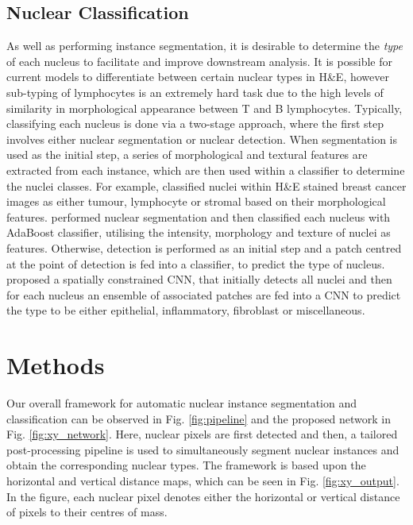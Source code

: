 \documentclass[journal]{IEEEtran}
\begin{document}
	\subsection{Nuclear Classification}
	As well as performing instance segmentation, it is desirable to determine the \textit{type} of each nucleus to facilitate and improve downstream analysis. It is possible for current models to differentiate between certain nuclear types in H\&E, however sub-typing of lymphocytes is an extremely hard task due to the high levels of similarity in morphological appearance between T and B lymphocytes. Typically, classifying each nucleus is done via a two-stage approach, where the first step involves either nuclear segmentation or nuclear detection. When segmentation is used as the initial step, a series of morphological and textural features are extracted from each instance, which are then used within a classifier to determine the nuclei classes. For example, \cite{nguyen2011prostate} classified nuclei within H\&E stained breast cancer images as either tumour, lymphocyte or stromal based on their morphological features. \cite{yuan2012quantitative} performed nuclear segmentation and then classified each nucleus with AdaBoost classifier, utilising the intensity, morphology and texture of nuclei as features. Otherwise, detection is performed as an initial step and a patch centred at the point of detection is fed into a classifier, to predict the type of nucleus. \cite{sirinukunwattana2016locality} proposed a spatially constrained CNN, that initially detects all nuclei and then for each nucleus an ensemble of associated patches are fed into a CNN to predict the type to be either epithelial, inflammatory, fibroblast or miscellaneous.
	
	


	\section{Methods} \label{section:methods}
	Our overall framework for automatic nuclear instance segmentation and classification can be observed in Fig. \ref{fig:pipeline} and the proposed network in Fig. \ref{fig:xy_network}. Here, nuclear pixels are first detected and then, a tailored post-processing pipeline is used to simultaneously segment nuclear instances and obtain the corresponding nuclear types. The framework is based upon the horizontal and vertical distance maps, which can be seen in Fig. \ref{fig:xy_output}. In the figure, each nuclear pixel denotes either the horizontal or vertical distance of pixels to their centres of mass.
	
\end{document}
